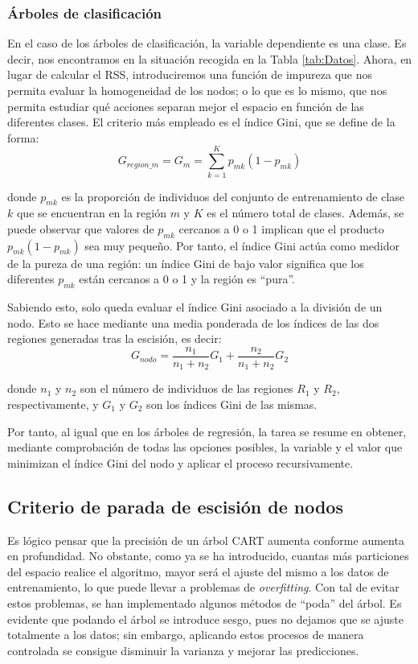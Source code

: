\documentclass[12pt,twoside]{article}
\begin{document}
\subsubsection{Árboles de clasificación}
En el caso de los árboles de clasificación, la variable dependiente es una clase. Es decir, nos encontramos en la situación recogida en la Tabla \ref{tab:Datos}. Ahora, en lugar de calcular el RSS, introduciremos una función de impureza que nos permita evaluar la homogeneidad de los nodos; o lo que es lo mismo, que nos permita estudiar qué acciones separan mejor el espacio en función de las diferentes clases. El criterio más empleado es el índice Gini, que se define de la forma:
\begin{equation*}
G_{region\_m} = G_m = \sum_{k=1}^K p_{mk}(1 - p_{mk})
\end{equation*}

\noindent
donde $p_{mk}$ es la proporción de individuos del conjunto de entrenamiento de clase $k$ que se encuentran en la región $m$ y $K$ es el número total de clases. Además, se puede observar que valores de $p_{mk}$ cercanos a 0 o 1 implican que el producto $p_{mk}(1- p_{mk})$ sea muy pequeño. Por tanto, el índice Gini actúa como medidor de la pureza de una región: un índice Gini de bajo valor significa que los diferentes $p_{mk}$ están cercanos a 0 o 1 y la región es ``pura''.

Sabiendo esto, solo queda evaluar el índice Gini asociado a la división de un nodo. Esto se hace mediante una media ponderada de los índices de las dos regiones generadas tras la escisión, es decir:
\begin{equation*}
G_{nodo} = \frac{n_1}{n_1 + n_2}G_1 + \frac{n_2}{n_1 + n_2}G_2
\end{equation*}

\noindent
donde  $n_1$ y $n_2$ son el número de individuos de las regiones $R_1$ y $R_2$, respectivamente, y $G_1$ y $G_2$ son los índices Gini de las mismas. 

Por tanto, al igual que en los árboles de regresión, la tarea se resume en obtener, mediante comprobación de todas las opciones posibles, la variable y el valor que minimizan el índice Gini del nodo y aplicar el proceso recursivamente.




\subsection{Criterio de parada de escisión de nodos}
Es lógico pensar que la precisión de un árbol CART aumenta conforme aumenta en profundidad. No obstante, como ya se ha introducido, cuantas más particiones del espacio realice el algoritmo, mayor será el ajuste del mismo a los datos de entrenamiento, lo que puede llevar a problemas de \textit{overfitting}. Con tal de evitar estos problemas, se han implementado algunos métodos de ``poda'' del árbol. Es evidente que podando el árbol se introduce sesgo, pues no dejamos que se ajuste totalmente a los datos; sin embargo, aplicando estos procesos de manera controlada se consigue disminuir la varianza y mejorar las predicciones.
\end{document}
